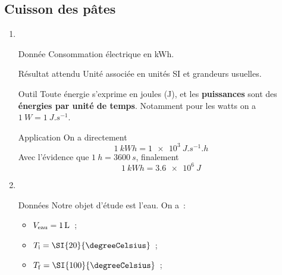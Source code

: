 \documentclass[../main/main.tex]{subfiles}
\begin{document}
\newpage

\subsection{Cuisson des pâtes}

\begin{enumerate}
	\item ~
	      \begin{tcbraster}[raster columns=3, raster equal height=rows]
		      \begin{tcolorbox}[blankest, space to=\myspace]
			      \begin{tcbraster}[raster columns=1]
				      \begin{NCdefi}[]{Donnée}
					      Consommation électrique en \si{kWh}.
				      \end{NCdefi}
				      \begin{NCprop}[add to natural height=\myspace]{Résultat attendu}
					      Unité associée en unités SI et grandeurs usuelles.
				      \end{NCprop}
			      \end{tcbraster}
		      \end{tcolorbox}
		      \begin{NCrapp}[raster multicolumn=1]{Outil}
			      Toute énergie s'exprime en joules (J), et les \textbf{puissances} sont des
			      \textbf{énergies par unité de temps}. Notamment pour les
			      watts on a $\SI{1}{W} = \SI{1}{J.s^{-1}}$.
		      \end{NCrapp}
		      \begin{NCexem}[raster multicolumn=1]{Application}
			      On a directement
			      \[ \SI{1}{kWh} = \SI{1e3}{J.s^{-1}.h}\]
			      Avec l'évidence que $ \SI{1}{h} = \SI{3600}{s}$, finalement
			      \[\boxed{\SI{1}{kWh} = \SI{3.6e6}{J}}\]
		      \end{NCexem}
	      \end{tcbraster}
	\item ~
	      \begin{tcbraster}[raster columns=2, raster equal height=rows]
		      \begin{NCdefi}[]{Données}
			      Notre objet d'étude est l'eau. On a~:
			      \begin{itemize}
				      \item $V_{\rm eau} = \SI{1}{L}$~;
				      \item $T_{\rm i} = \SI{20}{\degreeCelsius}$~;
				      \item $T_{\rm f} = \SI{100}{\degreeCelsius}$~;

\end{itemize}
\end{NCdefi}
\end{tcbraster}
\end{enumerate}
\end{document}

